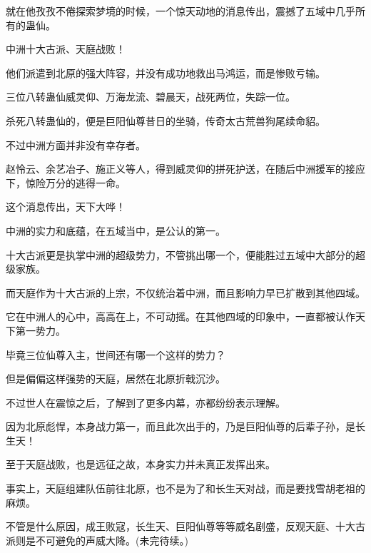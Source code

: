 \begin{this_body}
就在他孜孜不倦探索梦境的时候，一个惊天动地的消息传出，震撼了五域中几乎所有的蛊仙。

中洲十大古派、天庭战败！

他们派遣到北原的强大阵容，并没有成功地救出马鸿运，而是惨败亏输。

三位八转蛊仙威灵仰、万海龙流、碧晨天，战死两位，失踪一位。

杀死八转蛊仙的，便是巨阳仙尊昔日的坐骑，传奇太古荒兽狗尾续命貂。

不过中洲方面并非没有幸存者。

赵怜云、余艺冶子、施正义等人，得到威灵仰的拼死护送，在随后中洲援军的接应下，惊险万分的逃得一命。

这个消息传出，天下大哗！

中洲的实力和底蕴，在五域当中，是公认的第一。

十大古派更是执掌中洲的超级势力，不管挑出哪一个，便能胜过五域中大部分的超级家族。

而天庭作为十大古派的上宗，不仅统治着中洲，而且影响力早已扩散到其他四域。

它在中洲人的心中，高高在上，不可动摇。在其他四域的印象中，一直都被认作天下第一势力。

毕竟三位仙尊入主，世间还有哪一个这样的势力？

但是偏偏这样强势的天庭，居然在北原折戟沉沙。

不过世人在震惊之后，了解到了更多内幕，亦都纷纷表示理解。

因为北原彪悍，本身战力第一，而且此次出手的，乃是巨阳仙尊的后辈子孙，是长生天！

至于天庭战败，也是远征之故，本身实力并未真正发挥出来。

事实上，天庭组建队伍前往北原，也不是为了和长生天对战，而是要找雪胡老祖的麻烦。

不管是什么原因，成王败寇，长生天、巨阳仙尊等等威名剧盛，反观天庭、十大古派则是不可避免的声威大降。(未完待续。)

\end{this_body}

